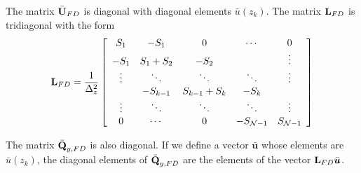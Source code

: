 \documentclass[10pt]{article}
\newcommand{\sN}{\mathcal{N}}
\newcommand{\mat}[1]{\text{\bf #1}}
\begin{document}
The matrix $\bar{\mat{U}}_{FD}$ is diagonal with diagonal elements $\bar u(z_k)$.
The matrix $\mat{L}_{FD}$ is tridiagonal with the form
\[\mat{L}_{FD} = \frac{1}{\Delta_z^2}\left[\begin{array}{ccccc}
S_1&-S_1&0&\cdots&0\\
-S_1&S_1+S_2&-S_2&&\vdots\\
\vdots&\ddots&\ddots&\ddots&\vdots\\
&-S_{k-1}&S_{k-1}+S_k&-S_k&\\
\vdots&\ddots&\ddots&\ddots&\vdots\\
0&\cdots&0&-S_{\sN-1}&S_{\sN-1}
\end{array}\right]\]

The matrix $\bar{\mat{Q}}_{y,FD}$ is also diagonal.
If we define a vector $\bar{\bm{u}}$ whose elements are $\bar u(z_k)$, the diagonal elements of $\bar{\mat{Q}}_{y,FD}$ are the elements of the vector $\mat{L}_{FD}\bar{\bm{u}}$.
\end{document}
